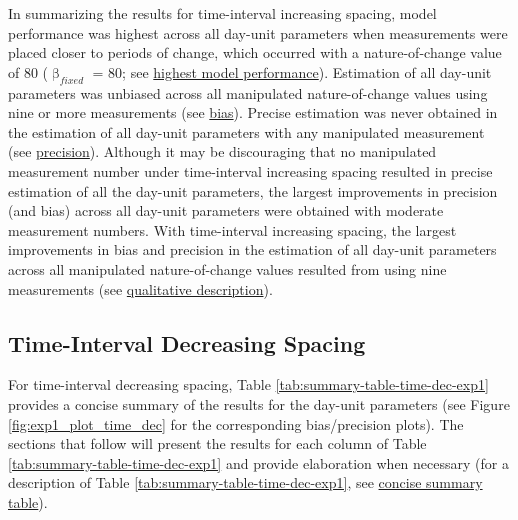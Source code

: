 \documentclass[
12pt, %
twoside,
english]{guelphthesis}
\begin{document}
In summarizing the results for time-interval increasing spacing, model performance was highest across all day-unit parameters when measurements were placed closer to periods of change, which occurred with a nature-of-change value of 80 (\(\upbeta_{fixed}\) = 80; see \protect\hyperlink{nature-change-time-inc-exp1}{highest model performance}). Estimation of all day-unit parameters was unbiased across all manipulated nature-of-change values using nine or more measurements (see \protect\hyperlink{bias-time-inc-exp1}{bias}). Precise estimation was never obtained in the estimation of all day-unit parameters with any manipulated measurement (see \protect\hyperlink{precision-time-inc-exp1}{precision}). Although it may be discouraging that no manipulated measurement number under time-interval increasing spacing resulted in precise estimation of all the day-unit parameters, the largest improvements in precision (and bias) across all day-unit parameters were obtained with moderate measurement numbers. With time-interval increasing spacing, the largest improvements in bias and precision in the estimation of all day-unit parameters across all manipulated nature-of-change values resulted from using nine measurements (see \protect\hyperlink{qualitative-time-inc-exp1}{qualitative description}).

\hypertarget{time-interval-decreasing-spacing}{%
\subsection{Time-Interval Decreasing Spacing}\label{time-interval-decreasing-spacing}}

For time-interval decreasing spacing, Table \ref{tab:summary-table-time-dec-exp1} provides a concise summary of the results for the day-unit parameters (see Figure \ref{fig:exp1_plot_time_dec} for the corresponding bias/precision plots). The sections that follow will present the results for each column of Table \ref{tab:summary-table-time-dec-exp1} and provide elaboration when necessary (for a description of Table \ref{tab:summary-table-time-dec-exp1}, see \protect\hyperlink{concise-tab}{concise summary table}).
\end{document}
